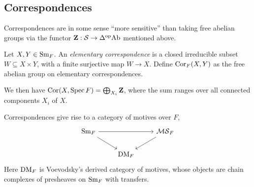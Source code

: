 \subsection{Correspondences}
Correspondences are in some sense ``more sensitive'' than taking free abelian groups via the functor $\mathbf{Z}:\mathcal{S}\to\Delta^{\mathrm{op}}\mathrm{Ab}$ mentioned above.
\begin{definition}
Let $X,Y\in\mathrm{Sm}_F$. An \emph{elementary correspondence} is a closed irreducible subset $W\subseteq X\times Y$, with a finite surjective map $W\to X$. Define $\operatorname{Cor}_F(X,Y)$ as the free abelian group on elementary correspondences.
\end{definition}
We then have $\operatorname{Cor}(X,\operatorname{Spec} F)=\bigoplus_{X_i}\mathbf{Z}$, where the sum ranges over all connected components $X_i$ of $X$.

Correspondences give rise to a category of motives over $F$,
\[\begin{tikzcd}\Sm_F\arrow{rr}\arrow{rd} & & \calMS_F\arrow{ld}\\
& \DM_F &
\end{tikzcd}\]
Here $\mathrm{DM}_F$ is Voevodsky's derived category of motives, whose objects are chain complexes of presheaves on $\mathrm{Sm}_F$ with transfers.


